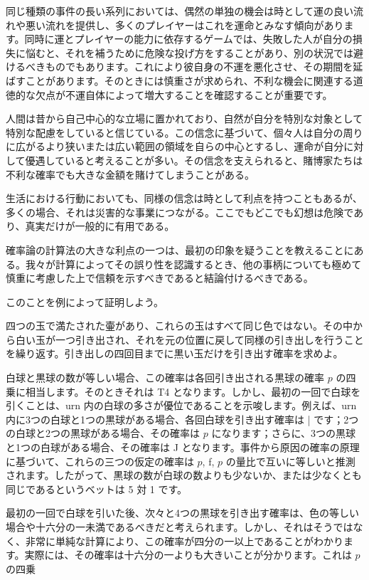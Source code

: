 \documentclass[a4paper,11pt,openany]{ltjsbook}
\begin{document}
同じ種類の事件の長い系列においては、偶然の単独の機会は時として運の良い流れや悪い流れを提供し、多くのプレイヤーはこれを運命とみなす傾向があります。同時に運とプレイヤーの能力に依存するゲームでは、失敗した人が自分の損失に悩むと、それを補うために危険な投げ方をすることがあり、別の状況では避けるべきものでもあります。これにより彼自身の不運を悪化させ、その期間を延ばすことがあります。そのときには慎重さが求められ、不利な機会に関連する道徳的な欠点が不運自体によって増大することを確認することが重要です。

人間は昔から自己中心的な立場に置かれており、自然が自分を特別な対象として特別な配慮をしていると信じている。この信念に基づいて、個々人は自分の周りに広がるより狭いまたは広い範囲の領域を自らの中心とするし、運命が自分に対して優遇していると考えることが多い。その信念を支えられると、賭博家たちは不利な確率でも大きな金額を賭けてしまうことがある。

生活における行動においても、同様の信念は時として利点を持つこともあるが、多くの場合、それは災害的な事業につながる。ここでもどこでも幻想は危険であり、真実だけが一般的に有用である。

確率論の計算法の大きな利点の一つは、最初の印象を疑うことを教えることにある。我々が計算によってその誤り性を認識するとき、他の事柄についても極めて慎重に考慮した上で信頼を示すべきであると結論付けるべきである。

このことを例によって証明しよう。

四つの玉で満たされた壷があり、これらの玉はすべて同じ色ではない。その中から白い玉が一つ引き出され、それを元の位置に戻して同様の引き出しを行うことを繰り返す。引き出しの四回目までに黒い玉だけを引き出す確率を求めよ。

白球と黒球の数が等しい場合、この確率は各回引き出される黒球の確率 $p$ の四乗に相当します。そのときそれは T4 となります。しかし、最初の一回で白球を引くことは、urn 内の白球の多さが優位であることを示唆します。例えば、urn 内に3つの白球と1つの黒球がある場合、各回白球を引き出す確率は | です；2つの白球と2つの黒球がある場合、その確率は $p$ になります；さらに、3つの黒球と1つの白球がある場合、その確率は J となります。事件から原因の確率の原理に基づいて、これらの三つの仮定の確率は $p$, f, $p$ の量比で互いに等しいと推測されます。したがって、黒球の数が白球の数よりも少ないか、または少なくとも同じであるというベットは 5 対 1 です。

最初の一回で白球を引いた後、次々と4つの黒球を引き出す確率は、色の等しい場合や十六分の一未満であるべきだと考えられます。しかし、それはそうではなく、非常に単純な計算により、この確率が四分の一以上であることがわかります。実際には、その確率は十六分の一よりも大きいことが分かります。これは $p$ の四乗
\end{document}
